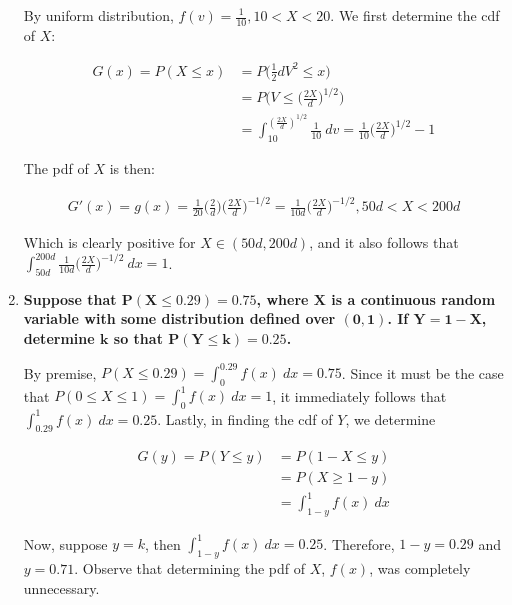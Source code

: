 \documentclass[10pt, oneside]{article}   	%
\theoremstyle{definition}
\begin{document}
\begin{enumerate}[label=5.\arabic*]
By uniform distribution, $f(v) = \frac{1}{10}, 10 < X < 20$. We first determine the cdf of $X$:

\begin{align*}
G(x) = P(X \leq x) &= P \Big( \frac{1}{2} dV^2 \leq x \Big) \\
&= P \Big( V \leq \Big( \frac{2X}{d} \Big)^{1/2} \Big) \\
&= \int^{(\frac{2X}{d})^{1/2}}_{10} \frac{1}{10} \ dv = \frac{1}{10} \Big( \frac{2X}{d} \Big)^{1/2} - 1
\end{align*}

The pdf of $X$ is then:

\begin{align*}
G'(x) = g(x) = \frac{1}{20} \Big( \frac{2}{d} \Big) \Big( \frac{2X}{d} \Big)^{-1/2} = \boxed{ \frac{1}{10d} \Big( \frac{2X}{d} \Big)^{-1/2}, 50d < X < 200d }
\end{align*}

Which is clearly positive for $X \in (50d, 200d)$, and it also follows that $\int^{200d}_{50d} \frac{1}{10d} \Big( \frac{2X}{d} \Big)^{-1/2} \ dx = \boxed{1}$.

\item  \begin{tcolorbox}[
  colback=Cerulean!5!white,
  colframe=Cerulean!75!black]
\textbf{Suppose that $\bm{P(X \leq 0.29) = 0.75}$, where $\bm{X}$ is a continuous random variable with some distribution defined over $\bm{(0,1)}$. If $\bm{Y = 1 - X}$, determine $\bm{k}$ so that $\bm{P(Y \leq k) = 0.25}$.}
\end{tcolorbox}

By premise, $P(X \leq 0.29) = \int^{0.29}_0 f(x) \ dx = 0.75$. Since it must be the case that $P(0 \leq X \leq 1) = \int^1_0 f(x) \ dx = 1$, it immediately follows that $\int^1_{0.29} f(x) \ dx = 0.25$. Lastly, in finding the cdf of $Y$, we determine

\begin{align*}
G(y) = P(Y \leq y) &= P(1 - X \leq y) \\
&= P(X \geq 1 - y) \\
&= \int^1_{1-y} f(x) \ dx
\end{align*}

Now, suppose $y = k$, then $\int^1_{1-y} f(x) \ dx = 0.25$. Therefore, $1 - y = 0.29$ and $\boxed{y = 0.71}$. Observe that determining the pdf of $X$, $f(x)$, was completely unnecessary.

\end{enumerate}
\end{document}

